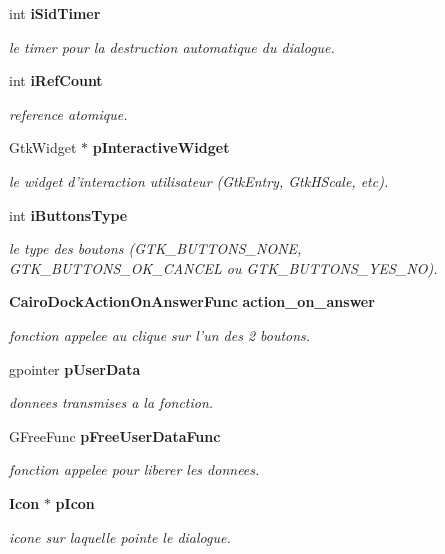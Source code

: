 \begin{CompactItemize}
int {\bf iSidTimer}
\begin{CompactList}\small\item\em le timer pour la destruction automatique du dialogue. \item\end{CompactList}\item 
int {\bf iRefCount}
\begin{CompactList}\small\item\em reference atomique. \item\end{CompactList}\item 
GtkWidget $\ast$ {\bf pInteractiveWidget}
\begin{CompactList}\small\item\em le widget d'interaction utilisateur (GtkEntry, GtkHScale, etc). \item\end{CompactList}\item 
int {\bf iButtonsType}
\begin{CompactList}\small\item\em le type des boutons (GTK\_\-BUTTONS\_\-NONE, GTK\_\-BUTTONS\_\-OK\_\-CANCEL ou GTK\_\-BUTTONS\_\-YES\_\-NO). \item\end{CompactList}\item 
{\bf CairoDockActionOnAnswerFunc} {\bf action\_\-on\_\-answer}
\begin{CompactList}\small\item\em fonction appelee au clique sur l'un des 2 boutons. \item\end{CompactList}\item 
gpointer {\bf pUserData}
\begin{CompactList}\small\item\em donnees transmises a la fonction. \item\end{CompactList}\item 
GFreeFunc {\bf pFreeUserDataFunc}
\begin{CompactList}\small\item\em fonction appelee pour liberer les donnees. \item\end{CompactList}\item 
{\bf Icon} $\ast$ {\bf pIcon}
\begin{CompactList}\small\item\em icone sur laquelle pointe le dialogue. \item\end{CompactList}\end{CompactItemize}


